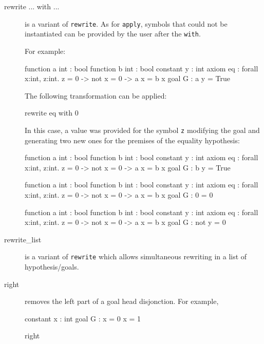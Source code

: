 \begin{description}
\item[rewrite ... with ...] is a variant of \texttt{rewrite}. As for
  \texttt{apply}, symbols that could not be instantiated can be provided by the
  user after the \texttt{with}.

  For example:
\begin{whycode}
function a int : bool
function b int : bool
constant y : int
axiom eq : forall x:int, z:int. z = 0 -> not x = 0 -> a x = b x
goal G : a y = True
\end{whycode}

The following transformation can be applied:

\begin{transwhy3}
rewrite eq with 0
\end{transwhy3}

In this case, a value was provided for the symbol \texttt{z} modifying the goal
and generating two new ones for the premises of the equality hypothesis:
\begin{whycode}
function a int : bool
function b int : bool
constant y : int
axiom eq : forall x:int, z:int. z = 0 -> not x = 0 -> a x = b x
goal G : b y = True
\end{whycode}

\begin{whycode}
function a int : bool
function b int : bool
constant y : int
axiom eq : forall x:int, z:int. z = 0 -> not x = 0 -> a x = b x
goal G : 0 = 0
\end{whycode}

\begin{whycode}
function a int : bool
function b int : bool
constant y : int
axiom eq : forall x:int, z:int. z = 0 -> not x = 0 -> a x = b x
goal G : not y = 0
\end{whycode}



\item[rewrite\_list] is a variant of \texttt{rewrite} which allows
  simultaneous rewriting in a list of hypothesis/goals.


\item[right] removes the left part of a goal head disjonction.
  For example,
\begin{whycode}
constant x : int
goal G : x = 0 \/ x = 1
\end{whycode}

\begin{transwhy3}
right
\end{transwhy3}


\end{description}
